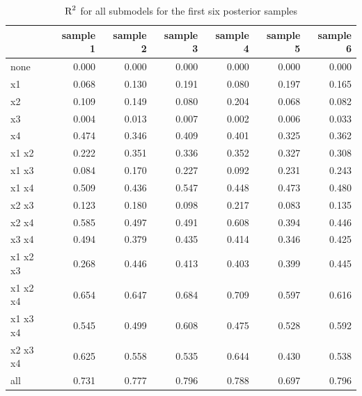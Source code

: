 \documentclass[11pt,a4paper,twoside]{book}
\newenvironment{knitrout}{}{} %
\begin{document}
\begin{knitrout}
\color{fgcolor}\begin{table}

\caption{\label{tab:simdata.postsample3}$ \text{R}^2$ for all submodels for the first six posterior samples}
\centering
\begin{tabular}[t]{lrrrrrr}
\toprule
  & sample 1 & sample 2 & sample 3 & sample 4 & sample 5 & sample 6\\
\midrule
none & 0.000 & 0.000 & 0.000 & 0.000 & 0.000 & 0.000\\
x1 & 0.068 & 0.130 & 0.191 & 0.080 & 0.197 & 0.165\\
x2 & 0.109 & 0.149 & 0.080 & 0.204 & 0.068 & 0.082\\
x3 & 0.004 & 0.013 & 0.007 & 0.002 & 0.006 & 0.033\\
x4 & 0.474 & 0.346 & 0.409 & 0.401 & 0.325 & 0.362\\
x1 x2 & 0.222 & 0.351 & 0.336 & 0.352 & 0.327 & 0.308\\
x1 x3 & 0.084 & 0.170 & 0.227 & 0.092 & 0.231 & 0.243\\
x1 x4 & 0.509 & 0.436 & 0.547 & 0.448 & 0.473 & 0.480\\
x2 x3 & 0.123 & 0.180 & 0.098 & 0.217 & 0.083 & 0.135\\
x2 x4 & 0.585 & 0.497 & 0.491 & 0.608 & 0.394 & 0.446\\
x3 x4 & 0.494 & 0.379 & 0.435 & 0.414 & 0.346 & 0.425\\
x1 x2 x3 & 0.268 & 0.446 & 0.413 & 0.403 & 0.399 & 0.445\\
x1 x2 x4 & 0.654 & 0.647 & 0.684 & 0.709 & 0.597 & 0.616\\
x1 x3 x4 & 0.545 & 0.499 & 0.608 & 0.475 & 0.528 & 0.592\\
x2 x3 x4 & 0.625 & 0.558 & 0.535 & 0.644 & 0.430 & 0.538\\
all & 0.731 & 0.777 & 0.796 & 0.788 & 0.697 & 0.796\\
\bottomrule
\end{tabular}
\end{table}


\end{knitrout}
\end{document}
